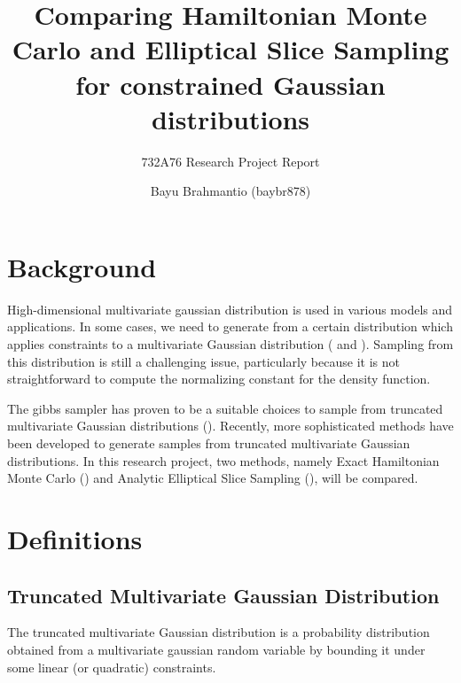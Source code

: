 \documentclass{scrartcl}
\title{Comparing Hamiltonian Monte Carlo and Elliptical Slice Sampling for constrained Gaussian distributions}
\subtitle{732A76 Research Project Report}
\author{Bayu Brahmantio (baybr878)}
\numberwithin{equation}{section}
\begin{document}
\maketitle

\section{Background}
High-dimensional multivariate gaussian distribution is used in various models and applications. In some cases, we need to generate from a certain distribution which applies constraints to a multivariate Gaussian distribution (\cite{gelfand1992GS} and \cite{RodrguezYam2004EfficientGS}). Sampling from this distribution is still a challenging issue, particularly because it is not straightforward to compute the normalizing constant for the density function.  

The gibbs sampler has proven to be a suitable choices to sample from truncated multivariate Gaussian distributions (\cite{gelfand1992GS}). Recently, more sophisticated methods have been developed to generate samples from truncated multivariate Gaussian distributions. In this research project, two methods, namely Exact Hamiltonian Monte Carlo (\cite{pakman2013exact}) and Analytic Elliptical Slice Sampling (\cite{Fagan2016ESSwEP}), will be compared. 


\section{Definitions}
\subsection{Truncated Multivariate Gaussian Distribution}
The truncated multivariate Gaussian distribution is a probability distribution obtained from a multivariate gaussian random variable by bounding it under some linear (or quadratic) constraints.   
\end{document}
